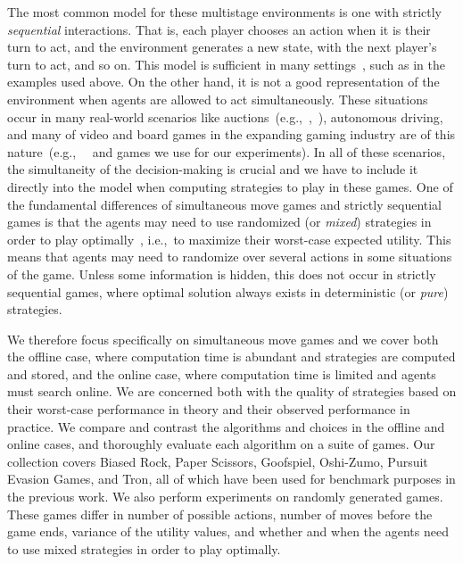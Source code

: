 \documentclass[preprint,12pt]{elsarticle}
\newcommand{\eg}{{e.g.,}~}
\newcommand{\ie}{{i.e.,}~}
\newcommand{\reviewchange}[1]{{\color{blue}#1}}
\begin{document}
The most common model for these multistage environments is one with strictly {\it sequential}
interactions. That is, each player chooses an action when it is their turn to act, and the environment
generates a new state, with the next player's turn to act, and so on. This model is sufficient in many
settings~\cite{AIbook}, such as in the examples used above.
\reviewchange{On the other hand, it is not a good representation of the environment when agents are allowed to act simultaneously.
These situations occur in many real-world scenarios like auctions~(\eg,~\cite{Keuter1997}), autonomous driving, and many of video and board games in the expanding gaming industry are of this nature~(\eg~\cite{Beard12Using,Teytaud11Upper} and games we use for our experiments).
In all of these scenarios, the simultaneity of the decision-making is crucial and we have to include it directly into the model when computing strategies to play in these games.}
One of the fundamental differences of simultaneous move games and strictly sequential
games is that the agents may need to use randomized (or \textit{mixed}) strategies in order to
play optimally~\cite{Gintis09},
\ie to maximize their worst-case expected utility.
This means that agents may need to randomize over several actions in some situations of the game.
Unless some information is hidden, this does not occur in strictly sequential games, where optimal
solution always exists in deterministic (or \textit{pure}) strategies.

\reviewchange{We therefore focus specifically on simultaneous move games and} we cover both the offline case, where computation time is
abundant and strategies are computed and stored, and the online case, where computation time is limited and
agents must search online. We are concerned both with the quality of strategies based on
their worst-case performance in theory and their observed performance in practice. We compare and
contrast the algorithms and choices in the offline and online cases, and thoroughly evaluate each
algorithm on a suite of games. Our collection covers Biased Rock, Paper Scissors, Goofspiel, Oshi-Zumo,
Pursuit Evasion Games, and Tron, all of which have been used for benchmark purposes
in the previous work. We also perform experiments on randomly generated games. These games differ
in number of possible actions, number of moves before the game ends, variance of the utility values,
and whether and when the agents need to use mixed strategies in order to play optimally.
\end{document}
